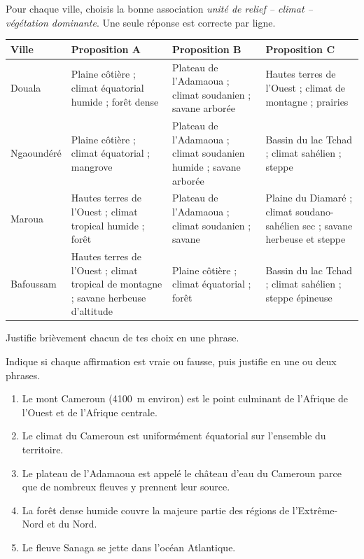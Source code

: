 \documentclass[11pt]{article}
\begin{document}
\begin{exercice}
Pour chaque ville, choisis la bonne association \emph{unité de relief -- climat -- végétation dominante}. Une seule réponse est correcte par ligne.

\begin{center}
\begin{tabularx}{\linewidth}{|l|X|X|X|}
\hline
\rowcolor{popblueL} \textbf{Ville} & \textbf{Proposition A} & \textbf{Proposition B} & \textbf{Proposition C} \\
\hline
Douala & Plaine côtière ; climat équatorial humide ; forêt dense & Plateau de l'Adamaoua ; climat soudanien ; savane arborée & Hautes terres de l'Ouest ; climat de montagne ; prairies \\
\hline
Ngaoundéré & Plaine côtière ; climat équatorial ; mangrove & Plateau de l'Adamaoua ; climat soudanien humide ; savane arborée & Bassin du lac Tchad ; climat sahélien ; steppe \\
\hline
Maroua & Hautes terres de l'Ouest ; climat tropical humide ; forêt & Plateau de l'Adamaoua ; climat soudanien ; savane & Plaine du Diamaré ; climat soudano-sahélien sec ; savane herbeuse et steppe \\
\hline
Bafoussam & Hautes terres de l'Ouest ; climat tropical de montagne ; savane herbeuse d'altitude & Plaine côtière ; climat équatorial ; forêt & Bassin du lac Tchad ; climat sahélien ; steppe épineuse \\
\hline
\end{tabularx}
\end{center}

Justifie brièvement chacun de tes choix en une phrase.
\end{exercice}

\begin{exercice}
Indique si chaque affirmation est vraie ou fausse, puis justifie en une ou deux phrases.
\begin{enumerate}
\item Le mont Cameroun (\SI{4100}{m} environ) est le point culminant de l'Afrique de l'Ouest et de l'Afrique centrale.
\item Le climat du Cameroun est uniformément équatorial sur l'ensemble du territoire.
\item Le plateau de l'Adamaoua est appelé le \og château d'eau \fg{} du Cameroun parce que de nombreux fleuves y prennent leur source.
\item La forêt dense humide couvre la majeure partie des régions de l'Extrême-Nord et du Nord.
\item Le fleuve Sanaga se jette dans l'océan Atlantique.
\end{enumerate}
\end{exercice}
\end{document}
